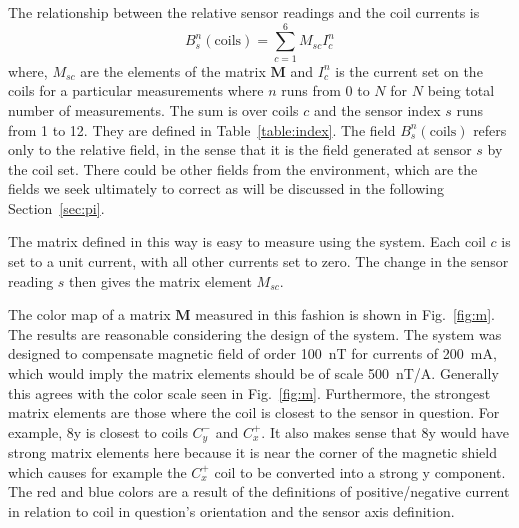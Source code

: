 The relationship between the relative sensor readings and the coil currents is
\begin{equation}\label{eq:B_coils}
    B_s^n(\mathrm{coils})=\sum_{c=1}^{6} M_{sc} I_c^n
\end{equation}
where, $M_{sc}$ are the elements of the matrix $\bm{M}$ and $I_c^n$ is the current set on the coils for a particular measurements where $n$ runs from 0 to $N$ for $N$ being total number of measurements. The sum is over coils $c$ and the sensor index $s$ runs from 1 to 12. They are defined in Table~\ref{table:index}. The field $B_s^n(\mathrm{coils})$ refers only to the relative field, in the sense that it is the field generated at sensor $s$ by the coil set. There could be other fields from the environment, which are the fields we seek ultimately to correct as will be discussed in the following Section~\ref{sec:pi}.






The matrix defined in this way is easy to measure using the system.  Each coil $c$ is set to a unit current, with all other currents set to zero.  The change in the sensor reading $s$ then gives the matrix element $M_{sc}$. 



The color map of a matrix $\bm{M}$ measured in this fashion is shown in Fig.~\ref{fig:m}.  The results are reasonable considering the design of the system.  The system was designed to compensate magnetic field of order 100~nT for currents of 200~mA, which would imply the matrix elements should be of scale 500~nT/A.  Generally this agrees with the color scale seen in Fig.~\ref{fig:m}.  Furthermore, the strongest matrix elements are those where the coil is closest to the sensor in question.  For example, 8y is closest to coils $C_y^-$ and $C_x^+$.  It also makes sense that 8y would have strong matrix elements here because it is near the corner of the magnetic shield which causes for example the $C_x^+$ coil to be converted into a strong y component.  The red and blue colors are a result of the definitions of positive/negative current in relation to coil in question's orientation and the sensor axis definition.



